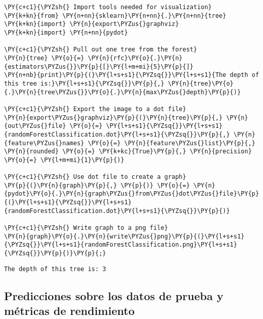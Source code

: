     \begin{tcolorbox}[breakable, size=fbox, boxrule=1pt, pad at break*=1mm,colback=cellbackground, colframe=cellborder]
\begin{Verbatim}[commandchars=\\\{\}]
\PY{c+c1}{\PYZsh{} Import tools needed for visualization}
\PY{k+kn}{from} \PY{n+nn}{sklearn}\PY{n+nn}{.}\PY{n+nn}{tree} \PY{k+kn}{import} \PY{n}{export\PYZus{}graphviz}
\PY{k+kn}{import} \PY{n+nn}{pydot}

\PY{c+c1}{\PYZsh{} Pull out one tree from the forest}
\PY{n}{tree} \PY{o}{=} \PY{n}{rfc}\PY{o}{.}\PY{n}{estimators\PYZus{}}\PY{p}{[}\PY{l+m+mi}{5}\PY{p}{]}
\PY{n+nb}{print}\PY{p}{(}\PY{l+s+s1}{\PYZsq{}}\PY{l+s+s1}{The depth of this tree is:}\PY{l+s+s1}{\PYZsq{}}\PY{p}{,} \PY{n}{tree}\PY{o}{.}\PY{n}{tree\PYZus{}}\PY{o}{.}\PY{n}{max\PYZus{}depth}\PY{p}{)}

\PY{c+c1}{\PYZsh{} Export the image to a dot file}
\PY{n}{export\PYZus{}graphviz}\PY{p}{(}\PY{n}{tree}\PY{p}{,} \PY{n}{out\PYZus{}file} \PY{o}{=} \PY{l+s+s1}{\PYZsq{}}\PY{l+s+s1}{randomForestClassification.dot}\PY{l+s+s1}{\PYZsq{}}\PY{p}{,} \PY{n}{feature\PYZus{}names} \PY{o}{=} \PY{n}{feature\PYZus{}list}\PY{p}{,} \PY{n}{rounded} \PY{o}{=} \PY{k+kc}{True}\PY{p}{,} \PY{n}{precision} \PY{o}{=} \PY{l+m+mi}{1}\PY{p}{)}

\PY{c+c1}{\PYZsh{} Use dot file to create a graph}
\PY{p}{(}\PY{n}{graph}\PY{p}{,} \PY{p}{)} \PY{o}{=} \PY{n}{pydot}\PY{o}{.}\PY{n}{graph\PYZus{}from\PYZus{}dot\PYZus{}file}\PY{p}{(}\PY{l+s+s1}{\PYZsq{}}\PY{l+s+s1}{randomForestClassification.dot}\PY{l+s+s1}{\PYZsq{}}\PY{p}{)}

\PY{c+c1}{\PYZsh{} Write graph to a png file}
\PY{n}{graph}\PY{o}{.}\PY{n}{write\PYZus{}png}\PY{p}{(}\PY{l+s+s1}{\PYZsq{}}\PY{l+s+s1}{randomForestClassification.png}\PY{l+s+s1}{\PYZsq{}}\PY{p}{)}\PY{p}{;} 
\end{Verbatim}
\end{tcolorbox}

    \begin{Verbatim}[commandchars=\\\{\}]
The depth of this tree is: 3
    \end{Verbatim}
    \hypertarget{predicciones-sobre-los-datos-de-prueba-y-muxe9tricas-de-rendimiento}{%
\subsection{Predicciones sobre los datos de prueba y métricas de
rendimiento}\label{predicciones-sobre-los-datos-de-prueba-y-muxe9tricas-de-rendimiento}}


